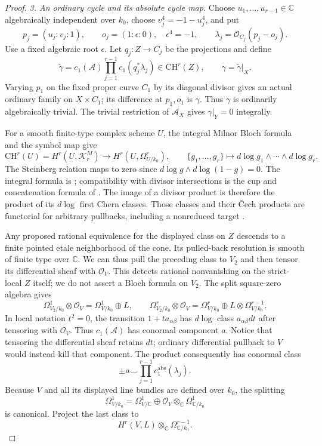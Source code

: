 \begin{proof}
\emph{3. An ordinary cycle and its absolute cycle map.}
Choose $u_1,\ldots,u_{r-1}\in\mathbb C$ algebraically
independent over $k_0$, choose $v_j^4=-1-u_j^4$, and put
\[
 p_j=(u_j:v_j:1),\qquad
 o_j=(1:\epsilon:0),\quad\epsilon^4=-1,\qquad
 \lambda_j=\mathcal O_{C_j}(p_j-o_j).
\]
Use a fixed algebraic root $\epsilon$. Let $q_j:Z\to C_j$
be the projections and define
\[
 \widetilde\gamma
      =c_1(\mathcal A)\prod_{j=1}^{r-1}c_1(q_j^*\lambda_j)
             \in\mathrm{CH}^r(Z),\qquad
 \gamma=\widetilde\gamma|_X.
\]
Varying $p_1$ on the fixed proper curve $C_1$ by its
diagonal divisor gives an actual ordinary family on
$X\times C_1$; its difference at $p_1,o_1$ is $\gamma$.
Thus $\gamma$ is ordinarily algebraically trivial.
The trivial restriction of $\mathcal A_X$ gives
$\gamma|_Y=0$ integrally.

For a smooth finite-type complex scheme $U$, the integral
Milnor Bloch formula and the symbol map give
\[
 \mathrm{CH}^r(U)=H^r(U,\mathcal K^M_r)
       \longrightarrow H^r(U,\Omega^r_{U/k_0}),\qquad
 \{g_1,\ldots,g_r\}\longmapsto
                   d\log g_1\wedge\cdots\wedge d\log g_r.
\]
The Steinberg relation maps to zero since
$d\log g\wedge d\log(1-g)=0$. The integral formula is
\citet[Theorems 7.1 and 7.5, author pp.~20--22]{cyKerz2009Milnor};
compatibility with divisor intersections is the cup and
concatenation formula of
\citet[Section 3, pp.~557--558]{cyBraunling2013}.
The image of a divisor product is therefore the product
of its $d\log$ first Chern classes. Those classes and
their \v Cech products are functorial for arbitrary
pullbacks, including a nonreduced target
\citep[Section 50.9 and Lemma 50.9.1, Tag 0FMD]{cyStacksHodgeChern}.

Any proposed rational equivalence for the displayed
class on $Z$ descends to a finite pointed etale
neighborhood of the cone. Its pulled-back resolution
is smooth of finite type over $\mathbb C$. We can thus
pull the preceding class to $V_2$ and then tensor its
differential sheaf with $\mathcal O_V$. This detects
rational nonvanishing on the strict-local $Z$ itself;
we do not assert a Bloch formula on $V_2$.
The split square-zero algebra gives
\[
 \Omega^1_{V_2/k_0}\otimes\mathcal O_V
       =\Omega^1_{V/k_0}\oplus L,
 \qquad
 \Omega^r_{V_2/k_0}\otimes\mathcal O_V
       =\Omega^r_{V/k_0}\oplus
                         L\otimes\Omega^{r-1}_{V/k_0}.
\]
In local notation $t^2=0$, the transition $1+t a_{\alpha\beta}$
has $d\log$ class $a_{\alpha\beta}dt$ after tensoring
with $\mathcal O_V$. Thus $c_1(\mathcal A)$ has
conormal component $a$. Notice that tensoring the
differential sheaf retains $dt$; ordinary differential
pullback to $V$ would instead kill that component.
The product consequently has conormal class
\[
                   \pm a\smile\prod_{j=1}^{r-1}
                                  c_1^{\mathrm{abs}}(\lambda_j).
\]
Because $V$ and all its displayed line bundles are defined
over $k_0$, the splitting
\[
 \Omega^1_{V/k_0}
   =\Omega^1_{V/\mathbb C}
          \oplus\mathcal O_V\otimes_{\mathbb C}
                         \Omega^1_{\mathbb C/k_0}
\]
is canonical. Project the last class to
\[
             H^r(V,L)\otimes_{\mathbb C}
                             \Omega^{r-1}_{\mathbb C/k_0}.
\]


\end{proof}
